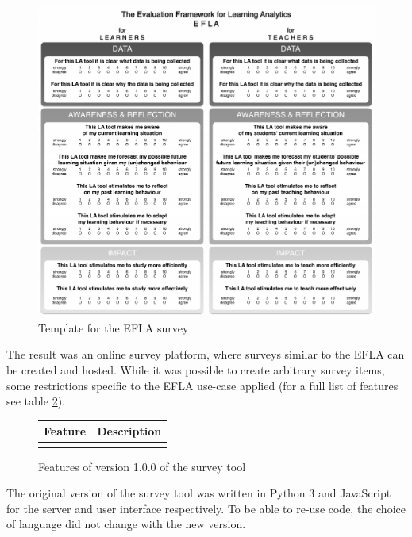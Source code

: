 \documentclass[a4paper,11pt]{article}
\begin{document}
            \begin{figure}[H]
                \centering
                \includegraphics[width=\textwidth]{EFLA--greyscale}
                \caption{Template for the EFLA survey \cite{efla-website}}
                \label{fig:efla-template}
            \end{figure}

           The result was an online survey platform, where surveys similar to the EFLA can be created
           and hosted. While it was possible to create arbitrary survey items, some restrictions
           specific to the EFLA use-case applied (for a full list of features see table \ref{table:v1-features}).

           \begin{figure}
               \centering
               \begin{tabular}{|l|l|}
                    Feature & Description \\
                    \hline
                    \\
                    \hline
               \end{tabular}
               \caption{Features of version 1.0.0 of the survey tool}
               \label{table:v1-features}
           \end{figure}

           The original version of the survey tool was written in Python 3 and JavaScript for the server
           and user interface respectively. To be able to re-use code, the choice of language did not
           change with the new version.
           
\end{document}

